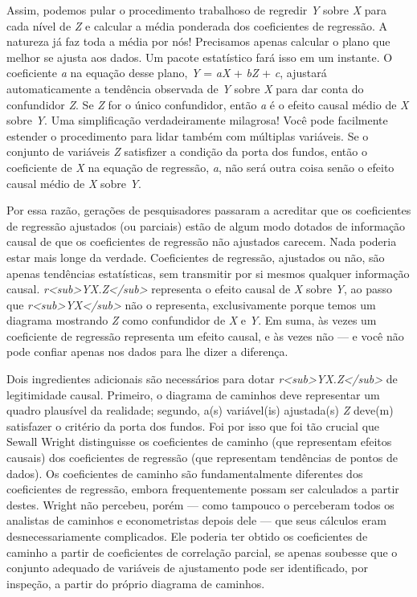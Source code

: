 \documentclass[11pt,a5paper,twoside]{book}
\begin{document}
Assim, podemos pular o procedimento trabalhoso de regredir \textit{Y} sobre \textit{X} para cada nível de \textit{Z} e calcular a média ponderada dos coeficientes de regressão. A natureza já faz toda a média por nós! Precisamos apenas calcular o plano que melhor se ajusta aos dados. Um pacote estatístico fará isso em um instante. O coeficiente \textit{a} na equação desse plano, \textit{Y} = \textit{aX} + \textit{bZ} + \textit{c}, ajustará automaticamente a tendência observada de \textit{Y} sobre \textit{X} para dar conta do confundidor \textit{Z}. Se \textit{Z} for o único confundidor, então \textit{a} é o efeito causal médio de \textit{X} sobre \textit{Y}. Uma simplificação verdadeiramente milagrosa! Você pode facilmente estender o procedimento para lidar também com múltiplas variáveis. Se o conjunto de variáveis \textit{Z} satisfizer a condição da porta dos fundos, então o coeficiente de \textit{X} na equação de regressão, \textit{a}, não será outra coisa senão o efeito causal médio de \textit{X} sobre \textit{Y}.

Por essa razão, gerações de pesquisadores passaram a acreditar que os coeficientes de regressão ajustados (ou parciais) estão de algum modo dotados de informação causal de que os coeficientes de regressão não ajustados carecem. Nada poderia estar mais longe da verdade. Coeficientes de regressão, ajustados ou não, são apenas tendências estatísticas, sem transmitir por si mesmos qualquer informação causal. \textit{r<sub>YX.Z</sub>} representa o efeito causal de \textit{X} sobre \textit{Y}, ao passo que \textit{r<sub>YX</sub>} não o representa, exclusivamente porque temos um diagrama mostrando \textit{Z} como confundidor de \textit{X} e \textit{Y}. Em suma, às vezes um coeficiente de regressão representa um efeito causal, e às vezes não — e você não pode confiar apenas nos dados para lhe dizer a diferença.

Dois ingredientes adicionais são necessários para dotar \textit{r<sub>YX.Z</sub>} de legitimidade causal. Primeiro, o diagrama de caminhos deve representar um quadro plausível da realidade; segundo, a(s) variável(is) ajustada(s) \textit{Z} deve(m) satisfazer o critério da porta dos fundos. Foi por isso que foi tão crucial que Sewall Wright distinguisse os coeficientes de caminho (que representam efeitos causais) dos coeficientes de regressão (que representam tendências de pontos de dados). Os coeficientes de caminho são fundamentalmente diferentes dos coeficientes de regressão, embora frequentemente possam ser calculados a partir destes. Wright não percebeu, porém — como tampouco o perceberam todos os analistas de caminhos e econometristas depois dele — que seus cálculos eram desnecessariamente complicados. Ele poderia ter obtido os coeficientes de caminho a partir de coeficientes de correlação parcial, se apenas soubesse que o conjunto adequado de variáveis de ajustamento pode ser identificado, por inspeção, a partir do próprio diagrama de caminhos.
\end{document}
